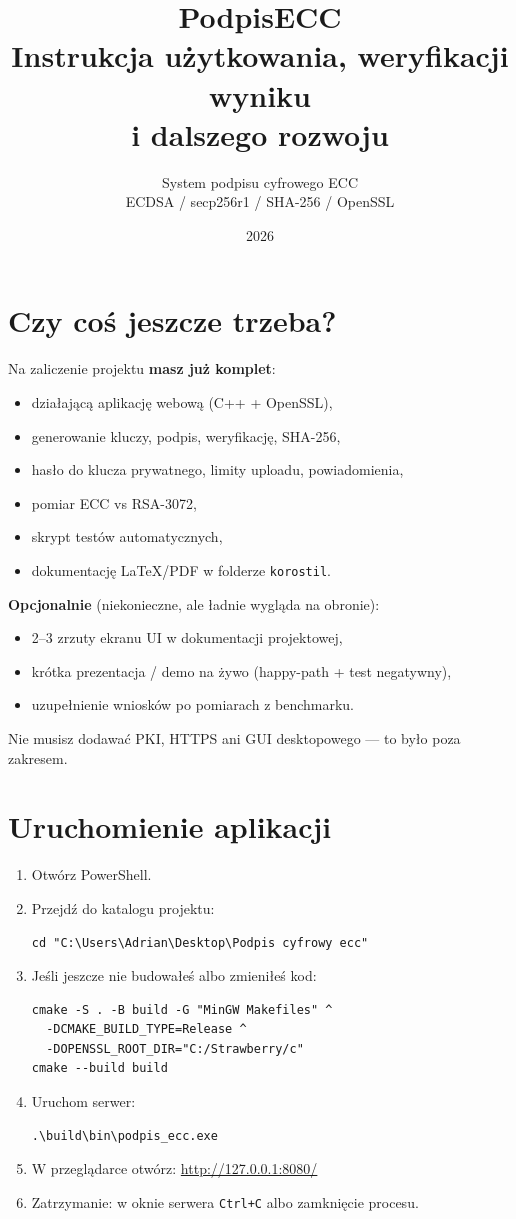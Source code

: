 \documentclass[12pt,a4paper]{article}
\title{\textbf{PodpisECC}\\[0.4em]
\large Instrukcja użytkowania, weryfikacji wyniku\\i dalszego rozwoju}
\author{System podpisu cyfrowego ECC\\ECDSA / secp256r1 / SHA-256 / OpenSSL}
\date{2026}
\begin{document}
\maketitle
\tableofcontents
\newpage

\section{Czy coś jeszcze trzeba?}

Na zaliczenie projektu \textbf{masz już komplet}:
\begin{itemize}[leftmargin=*]
  \item działającą aplikację webową (C++ + OpenSSL),
  \item generowanie kluczy, podpis, weryfikację, SHA-256,
  \item hasło do klucza prywatnego, limity uploadu, powiadomienia,
  \item pomiar ECC vs RSA-3072,
  \item skrypt testów automatycznych,
  \item dokumentację LaTeX/PDF w folderze \texttt{korostil}.
\end{itemize}

\textbf{Opcjonalnie} (niekonieczne, ale ładnie wygląda na obronie):
\begin{itemize}[leftmargin=*]
  \item 2--3 zrzuty ekranu UI w dokumentacji projektowej,
  \item krótka prezentacja / demo na żywo (happy-path + test negatywny),
  \item uzupełnienie wniosków po pomiarach z benchmarku.
\end{itemize}

Nie musisz dodawać PKI, HTTPS ani GUI desktopowego --- to było poza zakresem.

\section{Uruchomienie aplikacji}

\begin{enumerate}[leftmargin=*]
  \item Otwórz PowerShell.
  \item Przejdź do katalogu projektu:
\begin{verbatim}
cd "C:\Users\Adrian\Desktop\Podpis cyfrowy ecc"
\end{verbatim}
  \item Jeśli jeszcze nie budowałeś albo zmieniłeś kod:
\begin{verbatim}
cmake -S . -B build -G "MinGW Makefiles" ^
  -DCMAKE_BUILD_TYPE=Release ^
  -DOPENSSL_ROOT_DIR="C:/Strawberry/c"
cmake --build build
\end{verbatim}
  \item Uruchom serwer:
\begin{verbatim}
.\build\bin\podpis_ecc.exe
\end{verbatim}
  \item W przeglądarce otwórz: \url{http://127.0.0.1:8080/}
  \item Zatrzymanie: w oknie serwera \texttt{Ctrl+C} albo zamknięcie procesu.
\end{enumerate}
\end{document}
